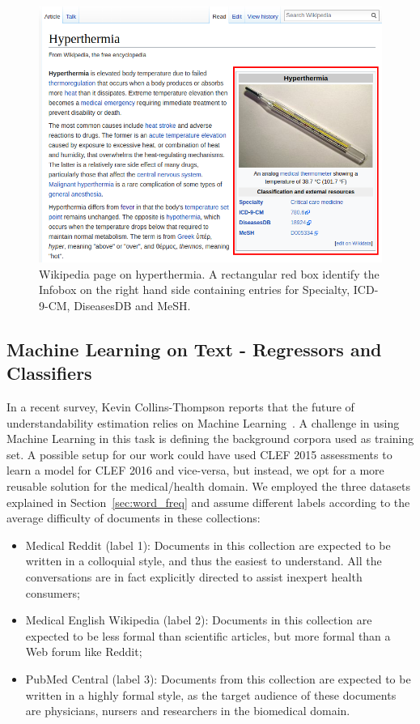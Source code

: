 \documentclass[runningheads,a4paper]{llncs}
\begin{document}
\begin{figure}[th!]
   \centering
   \includegraphics[width=1.00\textwidth]{graphics/hyperthermia}
    \caption{Wikipedia page on hyperthermia. A rectangular red box identify the Infobox on the right hand side containing entries for Specialty, ICD-9-CM, DiseasesDB and MeSH.}
    \label{fig:hyperthermia}
\end{figure}



\subsection{Machine Learning on Text - Regressors and Classifiers}

In a recent survey, Kevin Collins-Thompson reports that the future of understandability estimation relies on Machine Learning~\cite{collins2014computational}.
A challenge in using Machine Learning in this task is defining the background corpora used as training set.
A possible setup for our work could have used CLEF 2015 assessments to learn a model for CLEF 2016 and vice-versa, but instead, we opt for a 
more reusable solution for the medical/health domain. 
We employed the three datasets explained in Section~\ref{sec:word_freq} and assume different labels according to the average difficulty of documents in these collections:

\begin{itemize}
    \item Medical Reddit (label 1): Documents in this collection are expected to be written in a colloquial style, and thus the easiest to understand. All the conversations are in fact explicitly directed to assist inexpert health consumers;
    \item Medical English Wikipedia (label 2): Documents in this collection are expected to be less formal than scientific articles, but more formal than a Web forum like Reddit;
    \item PubMed Central (label 3): Documents from this collection are expected to be written in a highly formal style, as the target audience of these documents are physicians, nursers and researchers in the biomedical domain.
\end{itemize}
\end{document}
